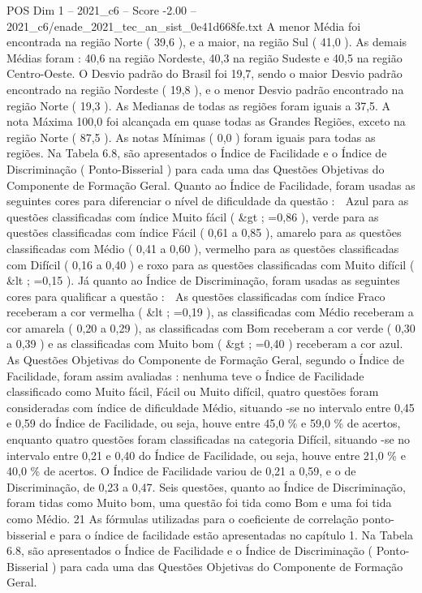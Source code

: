 \begin{textsample}{POS Dim 1 – 2021\_c6 – Score -2.00 – 2021\_c6/enade\_2021\_tec\_an\_sist\_0e41d668fe.txt}
A menor Média foi encontrada na região Norte ( 39,6 ), e a maior, na região Sul ( 41,0 ).
As demais Médias foram : 40,6 na região Nordeste, 40,3 na região Sudeste e 40,5 na região Centro-Oeste.
O Desvio padrão do Brasil foi 19,7, sendo o maior Desvio padrão encontrado na região Nordeste ( 19,8 ), e o menor Desvio padrão encontrado na região Norte ( 19,3 ).
As Medianas de todas as regiões foram iguais a 37,5.
A nota Máxima 100,0 foi alcançada em quase todas as Grandes Regiões, exceto na região Norte ( 87,5 ).
As notas Mínimas ( 0,0 ) foram iguais para todas as regiões.
Na Tabela 6.8, são apresentados o Índice de Facilidade e o Índice de Discriminação ( Ponto-Bisserial ) para cada uma das Questões Objetivas do Componente de Formação Geral.
Quanto ao Índice de Facilidade, foram usadas as seguintes cores para diferenciar o nível de dificuldade da questão :  Azul para as questões classificadas com índice Muito fácil ( \&gt ; =0,86 ), verde para as questões classificadas com índice Fácil ( 0,61 a 0,85 ), amarelo para as questões classificadas com Médio ( 0,41 a 0,60 ), vermelho para as questões classificadas com Difícil ( 0,16 a 0,40 ) e roxo para as questões classificadas com Muito difícil ( \&lt ; =0,15 ).
Já quanto ao Índice de Discriminação, foram usadas as seguintes cores para qualificar a questão :  As questões classificadas com índice Fraco receberam a cor vermelha ( \&lt ; =0,19 ), as classificadas com Médio receberam a cor amarela ( 0,20 a 0,29 ), as classificadas com Bom receberam a cor verde ( 0,30 a 0,39 ) e as classificadas com Muito bom ( \&gt ; =0,40 ) receberam a cor azul.
As Questões Objetivas do Componente de Formação Geral, segundo o Índice de Facilidade, foram assim avaliadas : nenhuma teve o Índice de Facilidade classificado como Muito fácil, Fácil ou Muito difícil, quatro questões foram consideradas com índice de dificuldade Médio, situando -se no intervalo entre 0,45 e 0,59 do Índice de Facilidade, ou seja, houve entre 45,0 \% e 59,0 \% de acertos, enquanto quatro questões foram classificadas na categoria Difícil, situando -se no intervalo entre 0,21 e 0,40 do Índice de Facilidade, ou seja, houve entre 21,0 \% e 40,0 \% de acertos.
O Índice de Facilidade variou de 0,21 a 0,59, e o de Discriminação, de 0,23 a 0,47.
Seis questões, quanto ao Índice de Discriminação, foram tidas como Muito bom, uma questão foi tida como Bom e uma foi tida como Médio. 21 As fórmulas utilizadas para o coeficiente de correlação ponto-bisserial e para o índice de facilidade estão apresentadas no capítulo 1.
Na Tabela 6.8, são apresentados o Índice de Facilidade e o Índice de Discriminação ( Ponto-Bisserial ) para cada uma das Questões Objetivas do Componente de Formação Geral.

\end{textsample}
